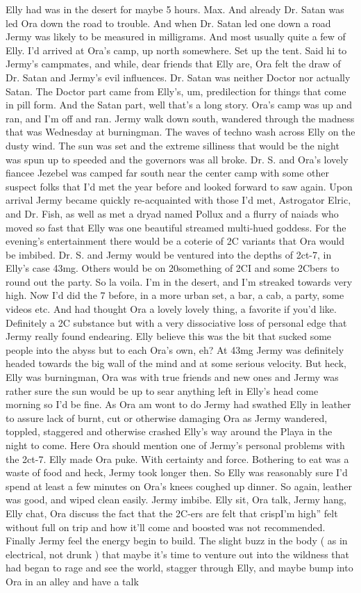 \documentclass[12pt]{book}
\begin{document}
Elly had was in the desert for maybe 5 hours. Max. And already Dr. Satan was led Ora down the road to trouble. And when Dr. Satan led one down a road Jermy was likely to be measured in milligrams. And most usually quite a few of Elly. I'd arrived at Ora's camp, up north somewhere. Set up the tent. Said hi to Jermy's campmates, and while, dear friends that Elly are, Ora felt the draw of Dr. Satan and Jermy's evil influences. Dr. Satan was neither Doctor nor actually Satan. The Doctor part came from Elly's, um, predilection for things that come in pill form. And the Satan part, well that's a long story. Ora's camp was up and ran, and I'm off and ran. Jermy walk down south, wandered through the madness that was Wednesday at burningman. The waves of techno wash across Elly on the dusty wind. The sun was set and the extreme silliness that would be the night was spun up to speeded and the governors was all broke. Dr. S. and Ora's lovely fiancee Jezebel was camped far south near the center camp with some other suspect folks that I'd met the year before and looked forward to saw again. Upon arrival Jermy became quickly re-acquainted with those I'd met, Astrogator Elric, and Dr. Fish, as well as met a dryad named Pollux and a flurry of naiads who moved so fast that Elly was one beautiful streamed multi-hued goddess. For the evening's entertainment there would be a coterie of 2C variants that Ora would be imbibed. Dr. S. and Jermy would be ventured into the depths of 2ct-7, in Elly's case 43mg. Others would be on 20something of 2CI and some 2Cbers to round out the party. So la voila. I'm in the desert, and I'm streaked towards very high. Now I'd did the 7 before, in a more urban set, a bar, a cab, a party, some videos etc. And had thought Ora a lovely lovely thing, a favorite if you'd like. Definitely a 2C substance but with a very dissociative loss of personal edge that Jermy really found endearing. Elly believe this was the bit that sucked some people into the abyss but to each Ora's own, eh? At 43mg Jermy was definitely headed towards the big wall of the mind and at some serious velocity. But heck, Elly was burningman, Ora was with true friends and new ones and Jermy was rather sure the sun would be up to sear anything left in Elly's head come morning so I'd be fine. As Ora am wont to do Jermy had swathed Elly in leather to assure lack of burnt, cut or otherwise damaging Ora as Jermy wandered, toppled, staggered and otherwise crashed Elly's way around the Playa in the night to come. Here Ora should mention one of Jermy's personal problems with the 2ct-7. Elly made Ora puke. With certainty and force. Bothering to eat was a waste of food and heck, Jermy took longer then. So Elly was reasonably sure I'd spend at least a few minutes on Ora's knees coughed up dinner. So again, leather was good, and wiped clean easily. Jermy imbibe. Elly sit, Ora talk, Jermy hang, Elly chat, Ora discuss the fact that the 2C-ers are felt that crispI'm high'' felt without full on trip and how it'll come and boosted was not recommended. Finally Jermy feel the energy begin to build. The slight buzz in the body ( as in electrical, not drunk ) that maybe it's time to venture out into the wildness that had began to rage and see the world, stagger through Elly, and maybe bump into Ora in an alley and have a talk 
\end{document}
